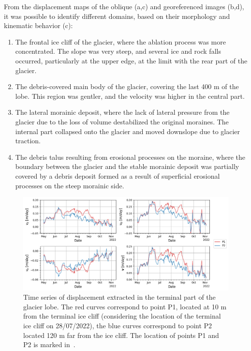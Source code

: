 From the displacement maps of the oblique (a,c) and
georeferenced images (b,d), it was possible to
identify different domains, based on their morphology and kinematic behavior
(c):
\begin{enumerate}
  \item The frontal ice cliff of the glacier, where the ablation process was more
        concentrated. The slope was very steep, and several ice and rock falls occurred,
        particularly at the upper edge, at the limit with the rear part of the glacier.
  \item The debris-covered main body of the glacier, covering the last 400 m of the
        lobe. This region was gentler, and the velocity was higher in the central part.
  \item The lateral morainic deposit, where the lack of lateral pressure from the
        glacier due to the loss of volume destabilized the original moraines. The
        internal part
        collapsed onto the glacier and moved downslope due to glacier traction.
  \item The debris talus resulting from erosional processes on the moraine, where the
        boundary between the glacier and the stable morainic deposit was partially
        covered by a
        debris deposit formed as a result of superficial erosional processes on the steep
        morainic side.
\end{enumerate}

\begin{figure}
  \includegraphics[width=174mm]{4_ts_velocities.png}
  \caption{Time series of displacement extracted in the terminal part of the glacier
    lobe.
    The red curves correspond to point P1, located at 10 m from the terminal ice cliff
    (considering the location of the terminal ice cliff on 28/07/2022), the blue curves
    correspond to point P2 located 120 m far from the ice
    cliff. The location of points P1 and P2 is marked in~.}
  \label{fig:4:velocity_ts}
\end{figure}

